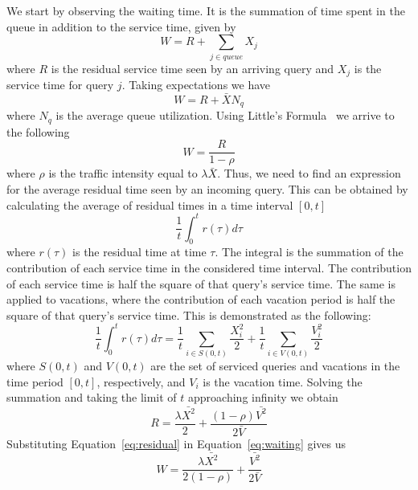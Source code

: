 We start by observing the waiting time. It is the summation of time spent in the queue in addition to the service time, given by
\begin{equation}
W = R + \sum_{j \in queue} X_j
\end{equation}
where $R$ is the residual service time seen by an arriving query and $X_j$ is the service time for query $j$. Taking expectations we have
\begin{equation}
W = R + \bar{X}N_q
\end{equation}
where $N_q$ is the average queue utilization. Using Little's Formula~\cite{21} we arrive to the following
\begin{equation}
\label{eq:waiting}
W = \frac{R}{1 - \rho}
\end{equation}
where $\rho$ is the traffic intensity equal to $\lambda\bar{X}$. Thus, we need to find an expression for the average residual time seen by an incoming query. This can be obtained by calculating the average of residual times in a time interval $[0, t]$
\begin{equation}
\frac{1}{t} \int_0^t r(\tau) d\tau
\end{equation}
where $r(\tau)$ is the residual time at time $\tau$. The integral is the summation of the contribution of each service time in the considered time interval. The contribution of each service time is half the square of that query's service time. The same is applied to vacations, where the contribution of each vacation period is half the square of that query's service time. This is demonstrated as the following:
\begin{equation}
\frac{1}{t} \int_0^t r(\tau) d\tau = \frac{1}{t} \sum_{i \in S(0,t)} \frac{X_i^2}{2} + \frac{1}{t} \sum_{i \in V(0,t)} \frac{V_i^2}{2}
\end{equation}
where $S(0,t)$ and $V(0,t)$ are the set of serviced queries and vacations in the time period $[0, t]$, respectively, and $V_i$ is the vacation time. Solving the summation and taking the limit of $t$ approaching infinity we obtain
\begin{equation}
\label{eq:residual}
R = \frac{\lambda\bar{X^2}}{2} + \frac{(1-\rho)\bar{V^2}}{2\bar{V}}
\end{equation}
Substituting Equation~\ref{eq:residual} in Equation~\ref{eq:waiting} gives us
\begin{equation}
\label{eq:waiting_2}
W = \frac{\lambda\bar{X^2}}{2 (1-\rho)} + \frac{\bar{V^2}}{2\bar{V}}
\end{equation}
